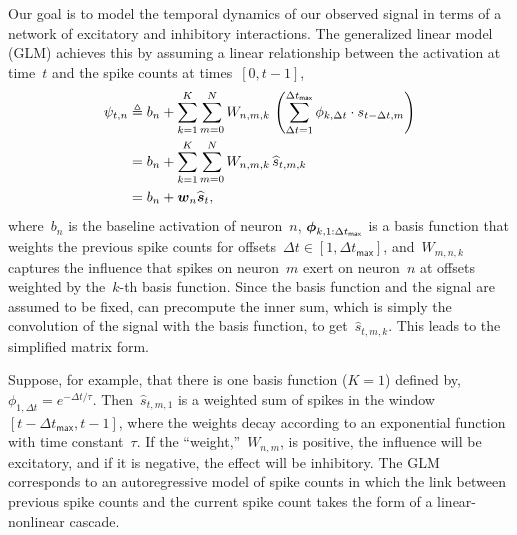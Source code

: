 Our goal is to model the temporal dynamics of our observed signal 
in terms of a network of excitatory and inhibitory interactions. 
The generalized linear model (GLM) \cite{Paninski-2004, Truccolo-2003, Pillow-2008} 
achieves this by assuming a linear relationship between the 
activation at time~$t$ and the spike counts at times~$[0,t-1]$,
\begin{align}
  \label{eq:glm_activation}
  \psi_{t,n} &\triangleq b_n  +                 
               \sum_{k=1}^K \sum_{m=0}^N W_{n,m,k} \, 
               \left( \sum_{\Delta t=1}^{\Delta t_{\mathsf{max}}} \phi_{k, \Delta t} \cdot s_{t-\Delta t, m} \right) \\
             &= b_n  + \sum_{k=1}^K \sum_{m=0}^N W_{n,m,k} \, \widehat{s}_{t,m,k} \\
             &= b_n + \boldsymbol{w}_n \widehat{\boldsymbol{s}}_t,
\end{align}
where~$b_n$ is the baseline activation of neuron~$n$,
$\boldsymbol{\phi}_{k,1:\Delta t_{\mathsf{max}}}$ is a basis function 
that weights the previous spike counts for 
offsets~${\Delta t \in [1, \Delta t_{\mathsf{max}}]}$,
and~$W_{m,n,k}$ captures the influence that
spikes on neuron~$m$ exert on neuron~$n$ at
offsets weighted by the~$k$-th basis function.  
Since the basis function and the signal 
are assumed to be fixed,  can precompute the inner sum, which is simply the 
convolution of the signal with the basis function, to get~$\widehat{s}_{t,m,k}$.
This leads to the simplified matrix form.

Suppose, for example, that there is one basis function ($K=1$) defined
by,~${\phi_{1,\Delta t} = e^{-\Delta t/\tau}}$.
Then~$\widehat{s}_{t,m,1}$ is a weighted sum of spikes in the
window~$[t-\Delta t_{\mathsf{max}},t-1]$, where the weights decay
according to an exponential function with time constant~$\tau$.  If
the ``weight,''~$W_{n,m}$, is positive, the influence will be
excitatory, and if it is negative, the effect will be inhibitory.  The
GLM corresponds to an autoregressive model of spike counts in which
the link between previous spike counts and the current spike count
takes the form of a linear-nonlinear cascade.




